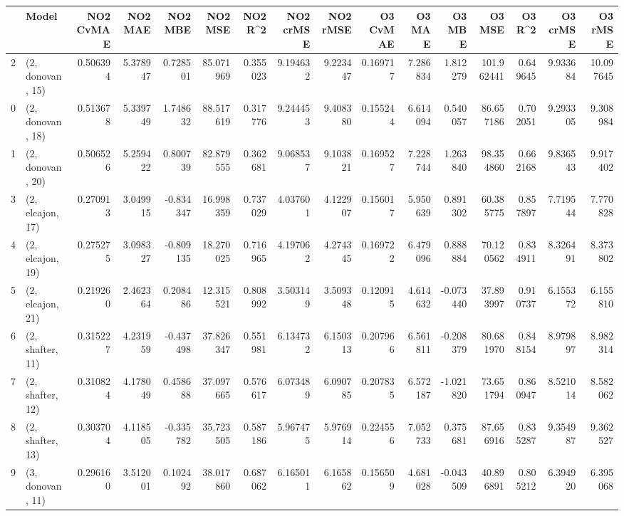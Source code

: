 \begin{tabular}{llrrrrrrrrrrrrrr}
\toprule
{} &             Model &  NO2 CvMAE &   NO2 MAE &   NO2 MBE &    NO2 MSE &   NO2 R\textasciicircum2 &  NO2 crMSE &  NO2 rMSE &  O3 CvMAE &    O3 MAE &    O3 MBE &      O3 MSE &    O3 R\textasciicircum2 &   O3 crMSE &    O3 rMSE \\
\midrule
2  &  (2, donovan, 15) &   0.506394 &  5.378947 &  0.728501 &  85.071969 &  0.355023 &   9.194632 &  9.223447 &  0.169717 &  7.286834 &  1.812279 &  101.962441 &  0.649645 &   9.933684 &  10.097645 \\
0  &  (2, donovan, 18) &   0.513678 &  5.339749 &  1.748632 &  88.517619 &  0.317776 &   9.244453 &  9.408380 &  0.155244 &  6.614094 &  0.540057 &   86.657186 &  0.702051 &   9.293305 &   9.308984 \\
1  &  (2, donovan, 20) &   0.506526 &  5.259422 &  0.800739 &  82.879555 &  0.362681 &   9.068537 &  9.103821 &  0.169527 &  7.228744 &  1.263840 &   98.354860 &  0.662168 &   9.836543 &   9.917402 \\
3  &  (2, elcajon, 17) &   0.270913 &  3.049915 & -0.834347 &  16.998359 &  0.737029 &   4.037601 &  4.122907 &  0.156017 &  5.950639 &  0.891302 &   60.385775 &  0.857897 &   7.719544 &   7.770828 \\
4  &  (2, elcajon, 19) &   0.275275 &  3.098327 & -0.809135 &  18.270025 &  0.716965 &   4.197062 &  4.274345 &  0.169722 &  6.479096 &  0.888884 &   70.120562 &  0.834911 &   8.326491 &   8.373802 \\
5  &  (2, elcajon, 21) &   0.219260 &  2.462364 &  0.208486 &  12.315521 &  0.808992 &   3.503149 &  3.509348 &  0.120915 &  4.614632 & -0.073440 &   37.893997 &  0.910737 &   6.155372 &   6.155810 \\
6  &  (2, shafter, 11) &   0.315227 &  4.231959 & -0.437498 &  37.826347 &  0.551981 &   6.134732 &  6.150313 &  0.207966 &  6.561811 & -0.208379 &   80.681970 &  0.848154 &   8.979897 &   8.982314 \\
7  &  (2, shafter, 12) &   0.310824 &  4.178049 &  0.458688 &  37.097665 &  0.576617 &   6.073489 &  6.090785 &  0.207835 &  6.572187 & -1.021820 &   73.651794 &  0.860947 &   8.521014 &   8.582062 \\
8  &  (2, shafter, 13) &   0.303704 &  4.118505 & -0.335782 &  35.723505 &  0.587186 &   5.967475 &  5.976914 &  0.224556 &  7.052733 &  0.375681 &   87.656916 &  0.835287 &   9.354987 &   9.362527 \\
9  &  (3, donovan, 11) &   0.296160 &  3.512001 &  0.102492 &  38.017860 &  0.687062 &   6.165011 &  6.165862 &  0.156509 &  4.681028 & -0.043509 &   40.896891 &  0.805212 &   6.394920 &   6.395068 \\

\end{tabular}
